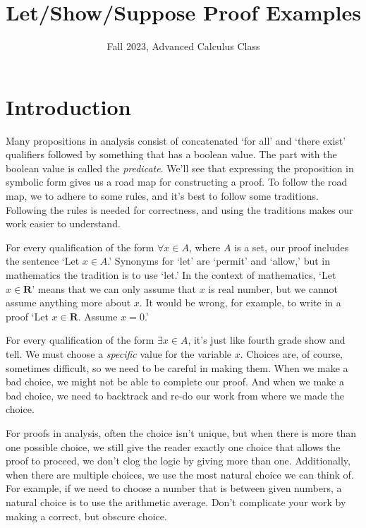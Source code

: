 \documentclass[12pt,fleqn,answers]{article}
\title{Let/Show/Suppose Proof Examples}
\author{Fall 2023, Advanced Calculus Class}
\newcommand{\reals}{\mathbf{R}}
\begin{document}
\maketitle

\section{Introduction}

Many propositions in analysis consist of concatenated `for all' and `there exist'  qualifiers followed by something that has a boolean value.  
The part with the boolean value is called the \emph{predicate}. We'll see that expressing the proposition in symbolic 
form gives us a road map for constructing  a proof. To follow the road map, we to 
adhere to some rules, and it's best to follow some traditions.  Following the rules is 
needed for correctness,  and using the  traditions makes 
 our work easier to understand.

For every qualification of the form $\forall x \in A$, where $A$ is a set, our proof includes the sentence `Let $x \in A$.'  Synonyms  for  `let' 
are `permit' and `allow,' but in mathematics the tradition is to use `let.' In the context of mathematics, `Let $x \in \reals$' means that we can only assume that $x$ is real number, but we cannot assume anything more about $x$. It would be wrong, for example, to write in a proof  
`Let $x \in \reals$. Assume $x = 0$.'

For every qualification of the form $\exists x \in A$, it's just like fourth grade show and tell. We must choose a \emph{specific} value for the 
variable $x$. Choices are, of course, sometimes difficult, so we need to be careful in making them. When we make a bad choice, we might not be able to complete our proof. And when we  make a bad choice, we need to backtrack and re-do our work from where
we made the choice.

For proofs in analysis, often the choice isn't unique, but when there is more than one possible choice,
we still give the reader exactly one choice that allows the proof to proceed, we don't clog the logic by giving more than one.
Additionally, when there are multiple choices, we use the most natural choice we can think of. For example, if we need to choose a number that is between
given numbers, a natural choice is to use the arithmetic average. Don't complicate your work by making a correct, but obscure choice.
\end{document}
